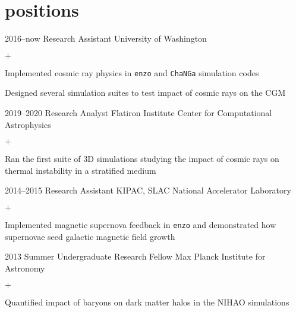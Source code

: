 \documentclass[]{luger-cv} %
\begin{document}
\section{positions}
\begin{entrylist}


\entry
{2016--now}
{Research Assistant}
{University of Washington}
{%
\vspace{-1em}
\begin{list}{$+$}{\cvlist}
\item Implemented cosmic ray physics in \texttt{enzo} and \texttt{ChaNGa} simulation codes
\item Designed several simulation suites to test impact of cosmic rays on the CGM
\end{list}
}


\entry
{2019--2020}
{Research Analyst}
{Flatiron Institute Center for Computational Astrophysics}
{%
\vspace{-1em}
\begin{list}{$+$}{\cvlist}
\item Ran the first suite of 3D simulations studying the impact of cosmic rays on thermal instability in a stratified medium
\end{list}
}


\entry
{2014--2015}
{Research Assistant}
{KIPAC, SLAC National Accelerator Laboratory}
{%
\vspace{-1em}
\begin{list}{$+$}{\cvlist}
\item Implemented magnetic supernova feedback in \texttt{enzo} and demonstrated how supernovae seed galactic magnetic field growth
\end{list}
}


\ifdefined \onepage \else
\entry
{2013}
{Summer Undergraduate Research Fellow}
{Max Planck Institute for Astronomy}
{%
\vspace{-1em}
\begin{list}{$+$}{\cvlist}
\item Quantified impact of baryons on dark matter halos in the NIHAO simulations
\end{list}
}


\end{entrylist}
\end{document}
